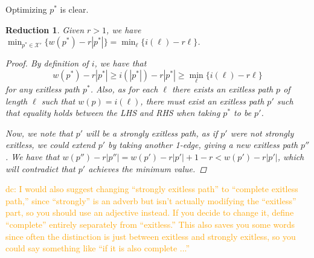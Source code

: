 \documentclass{article}
\newtheorem{red}[result]{Reduction}
\theoremstyle{definition}
\newcommand{\dc}[1]{\textcolor{orange}{dc: #1}}
\begin{document}
\vspace{.75em}
Optimizing $p^*$ is clear.
\begin{red} Given $r > 1$, we have $\min_{p^* \in \mathcal{X}'}\{w(p^*)-r|p^*|\} = \min_{\ell}\{i(\ell)-r\ell\}$.
\begin{proof}
By definition of $i$, we have that \[w(p^*)-r|p^*| \geq i(|p^*|)-r|p^*| \geq \min_{\ell}\{i(\ell)-r\ell\}\] for any exitless path $p^*$. Also, as for each $\ell$ there exists an exitless path $p$ of length $\ell$ such that $w(p) = i(\ell)$, there must exist an exitless path $p'$ such that equality holds between the LHS and RHS when taking $p^*$ to be $p'$. 

Now, we note that $p'$ will be a strongly exitless path, as if $p'$ were not strongly exitless, we could extend $p'$ by taking another 1-edge, giving a new exitless path $p''$. We have that $w(p'') -r|p''| = w(p')-r|p'|+1-r<w(p')-r|p'|$, which will contradict that $p'$ achieves the minimum value.  \end{proof}\end{red}

\dc{ I would also suggest changing ``strongly exitless path'' to ``complete exitless path,'' since ``strongly'' is an adverb but isn't actually modifying the ``exitless'' part, so you should use an adjective instead. If you decide to change it, define ``complete'' entirely separately from ``exitless.'' This also saves you some words since often the distinction is just between exitless and strongly exitless, so you could say something like ``if it is also complete ...''}
\end{document}
